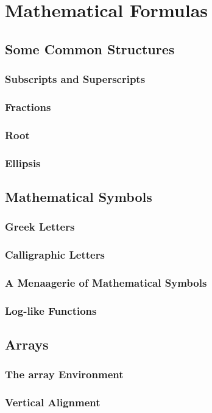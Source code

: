 \section{Mathematical Formulas}
\subsection{Some Common Structures}
\subsubsection{Subscripts and Superscripts}
\subsubsection{Fractions}
\subsubsection{Root}
\subsubsection{Ellipsis}


\subsection{Mathematical Symbols}
\subsubsection{Greek Letters}
\subsubsection{Calligraphic Letters}
\subsubsection{A Menaagerie of Mathematical Symbols}
\subsubsection{Log-like Functions}


\subsection{Arrays}
\subsubsection{The array Environment}
\subsubsection{Vertical Alignment}
